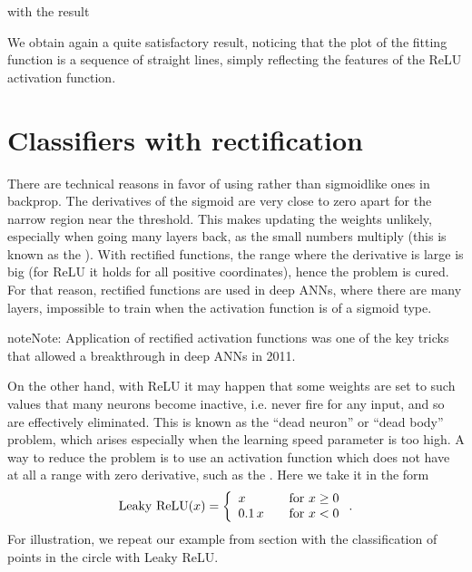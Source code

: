 \documentclass[letterpaper,10pt,english]{jupyterBook}
\begin{document}
\sphinxAtStartPar
with the result

\noindent{}

\sphinxAtStartPar
We obtain again a quite satisfactory result, noticing that the plot of the fitting function is a sequence of straight lines, simply reflecting the features of the ReLU activation function.


\section{Classifiers with rectification}
\label{\detokenize{docs/rectification:classifiers-with-rectification}}
\sphinxAtStartPar
There are technical reasons in favor of using  rather than sigmoid\sphinxhyphen{}like ones in backprop. The derivatives of the sigmoid are very close to zero apart for the narrow region near the threshold. This makes updating the weights unlikely, especially when going many layers back, as the small numbers multiply (this is known as the ). With rectified functions, the range where the derivative is large is big (for ReLU it holds for all positive coordinates), hence the problem is cured. For that reason, rectified functions are used in deep ANNs, where there are many layers, impossible to train when the activation function is of a sigmoid type.

\begin{sphinxadmonition}{note}{Note:}
\sphinxAtStartPar
Application of rectified activation functions was one of the key tricks that allowed a breakthrough in deep ANNs in 2011.
\end{sphinxadmonition}

\sphinxAtStartPar
On the other hand, with ReLU it may happen that some weights are set to such values that many neurons become inactive, i.e. never fire for any input, and so are effectively eliminated. This is known as the “dead neuron” or “dead body” problem, which arises especially when the learning speed parameter is too high. A way to reduce the problem is to use an activation function which does not have at all a range with zero derivative, such as the . Here we take it in the form
\begin{equation*}
\begin{split}
{\rm Leaky~ReLU}(x) = \left \{ \begin{array}{ll} x &{\rm ~~~ for~} x \ge 0 \\
                                          0.1 \, x &{\rm ~~~ for~} x < 0 \end{array}    \right . .
\end{split}
\end{equation*}
\sphinxAtStartPar
For illustration, we repeat our example from section {\hyperref[\detokenize{docs/backprop:circ-lab}]{}} with the classification of points in the circle with Leaky ReLU.
\end{document}
